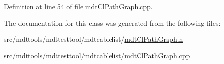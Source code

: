 Definition at line 54 of file mdt\-Cl\-Path\-Graph.\-cpp.



The documentation for this class was generated from the following files\-:\begin{DoxyCompactItemize}
\item 
src/mdttools/mdttesttool/mdtcablelist/\hyperlink{mdt_cl_path_graph_8h}{mdt\-Cl\-Path\-Graph.\-h}\item 
src/mdttools/mdttesttool/mdtcablelist/\hyperlink{mdt_cl_path_graph_8cpp}{mdt\-Cl\-Path\-Graph.\-cpp}\end{DoxyCompactItemize}
